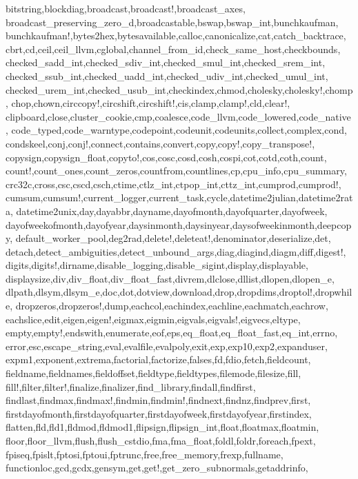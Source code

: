 {{bitstring,blockdiag,broadcast,broadcast!,broadcast_axes,%
broadcast_preserving_zero_d,broadcastable,bswap,bswap_int,bunchkaufman,%
bunchkaufman!,bytes2hex,bytesavailable,calloc,canonicalize,cat,catch_backtrace,%
cbrt,cd,ceil,ceil_llvm,cglobal,channel_from_id,check_same_host,checkbounds,%
checked_sadd_int,checked_sdiv_int,checked_smul_int,checked_srem_int,%
checked_ssub_int,checked_uadd_int,checked_udiv_int,checked_umul_int,%
checked_urem_int,checked_usub_int,checkindex,chmod,cholesky,cholesky!,chomp,%
chop,chown,circcopy!,circshift,circshift!,cis,clamp,clamp!,cld,clear!,%
clipboard,close,cluster_cookie,cmp,coalesce,code_llvm,code_lowered,code_native,%
code_typed,code_warntype,codepoint,codeunit,codeunits,collect,complex,cond,%
condskeel,conj,conj!,connect,contains,convert,copy,copy!,copy_transpose!,%
copysign,copysign_float,copyto!,cos,cosc,cosd,cosh,cospi,cot,cotd,coth,count,%
count!,count_ones,count_zeros,countfrom,countlines,cp,cpu_info,cpu_summary,%
crc32c,cross,csc,cscd,csch,ctime,ctlz_int,ctpop_int,cttz_int,cumprod,cumprod!,%
cumsum,cumsum!,current_logger,current_task,cycle,datetime2julian,datetime2rata,%
datetime2unix,day,dayabbr,dayname,dayofmonth,dayofquarter,dayofweek,%
dayofweekofmonth,dayofyear,daysinmonth,daysinyear,daysofweekinmonth,deepcopy,%
default_worker_pool,deg2rad,delete!,deleteat!,denominator,deserialize,det,%
detach,detect_ambiguities,detect_unbound_args,diag,diagind,diagm,diff,digest!,%
digits,digits!,dirname,disable_logging,disable_sigint,display,displayable,%
displaysize,div,div_float,div_float_fast,divrem,dlclose,dllist,dlopen,dlopen_e,%
dlpath,dlsym,dlsym_e,doc,dot,dotview,download,drop,dropdims,droptol!,dropwhile,%
dropzeros,dropzeros!,dump,eachcol,eachindex,eachline,eachmatch,eachrow,%
eachslice,edit,eigen,eigen!,eigmax,eigmin,eigvals,eigvals!,eigvecs,eltype,%
empty,empty!,endswith,enumerate,eof,eps,eq_float,eq_float_fast,eq_int,errno,%
error,esc,escape_string,eval,evalfile,evalpoly,exit,exp,exp10,exp2,expanduser,%
expm1,exponent,extrema,factorial,factorize,falses,fd,fdio,fetch,fieldcount,%
fieldname,fieldnames,fieldoffset,fieldtype,fieldtypes,filemode,filesize,fill,%
fill!,filter,filter!,finalize,finalizer,find_library,findall,findfirst,%
findlast,findmax,findmax!,findmin,findmin!,findnext,findnz,findprev,first,%
firstdayofmonth,firstdayofquarter,firstdayofweek,firstdayofyear,firstindex,%
flatten,fld,fld1,fldmod,fldmod1,flipsign,flipsign_int,float,floatmax,floatmin,%
floor,floor_llvm,flush,flush_cstdio,fma,fma_float,foldl,foldr,foreach,fpext,%
fpiseq,fpislt,fptosi,fptoui,fptrunc,free,free_memory,frexp,fullname,%
functionloc,gcd,gcdx,gensym,get,get!,get_zero_subnormals,getaddrinfo,%
}}
